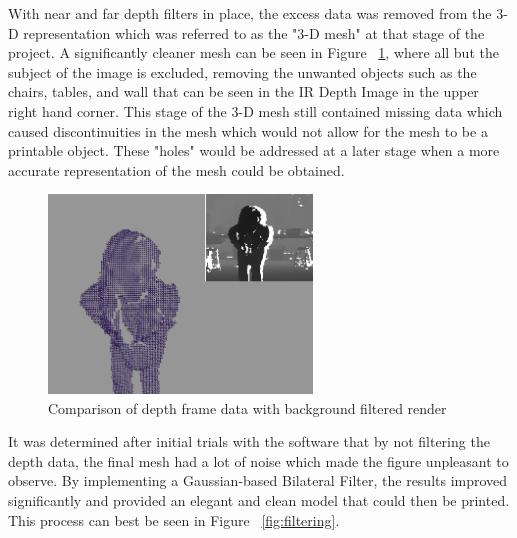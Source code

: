 \documentclass[pdftex,10.5pt]{report}
\begin{document}
With near and far depth filters in place, the excess data was removed from the 3-D representation which was referred to as the "3-D mesh" at that stage of the project. A significantly cleaner mesh can be seen in Figure ~\ref{balls2}, where all but the subject of the image is excluded, removing the unwanted objects such as the chairs, tables, and wall that can be seen in the IR Depth Image in the upper right hand corner. This stage of the 3-D mesh still contained missing data which caused discontinuities in the mesh which would not allow for the mesh to be a printable object. These "holes" would be addressed at a later stage when a more accurate representation of the mesh could be obtained.
\begin{figure}[H]
	\centering
	\includegraphics[width=70mm]{figures/cadyholdingball2.png}
	\caption{Comparison of depth frame data with background filtered render}
	\label{balls2}
\end{figure}

It was determined after initial trials with the software that by not filtering the depth data, the final mesh had a lot of noise which made the figure unpleasant to observe. By implementing a Gaussian-based Bilateral Filter, the results improved significantly and provided an elegant and clean model that could then be printed. This process can best be seen in Figure ~\ref{fig:filtering}.
\end{document}
